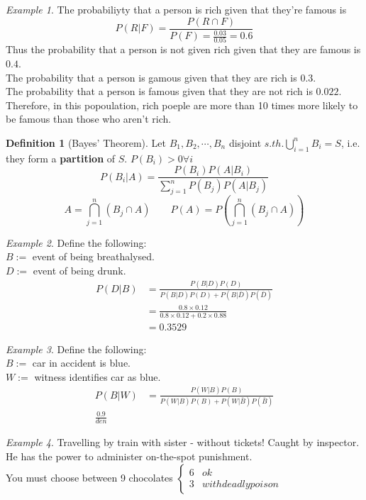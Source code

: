 \documentclass{article}
\let\ddd\cdots
\theoremstyle{definition}
\newtheorem{definition}{Definition}[section]
\theoremstyle{remark}
\theoremstyle{example}
\newtheorem*{example}{Example}
\begin{document}
	\begin{example}
		The probabiliyty that a person is rich given that they're famous is \[P(R|F)=\frac{P(R \cap F)}{P(F)= \frac{0.03}{0.05}=0.6} \]
		Thus the probability that a person is not given rich given that they are famous is $0.4$.\\
		The probability that a person is gamous given that they are rich is $0.3$.\\
		The probability that a person is famous given that they are not rich is $0.022$.\\
		Therefore, in this popoulation, rich poeple are more than 10 times more likely to be famous than those who aren't rich.
	\end{example}

	\begin{definition}[Bayes' Theorem]
		Let $B_1,B_2,\ddd,B_n$ disjoint $s.th. \bigcup_{i=1}^n B_i = S$, i.e. they form a \textbf{partition} of $S$. $P(B_i)>0 \forall i$
		\[	P(B_i|A)=\frac{P(B_i)P(A|B_i)}{\sum_{j=1}^{n}P(B_j)P(A|B_j)} \]
		\[ A = \bigcap_{j=1}^n(B_j \cap A) \qquad P(A)=P\left(\bigcap_{j=1}^n (B_j \cap A)\right) \]
	\end{definition}

	\begin{example}Define the following:\\
		$B := $ event of being breathalysed.\\
		$D := $ event of being drunk.
		\begin{align*}
			P(D|B) & = \frac{P(B|D)P(D)}{P(B|D)P(D)+P(B|\bar{D})P(\bar{D})}\\
			& = \frac{0.8 \times 0.12}{0.8 \times 0.12 + 0.2 \times 0.88}\\
			& = 0.3529
		\end{align*}
	\end{example}

	\begin{example}
		Define the following:\\
		$B:= $ car in accident is blue.\\
		$W:= $ witness identifies car as blue.
		\begin{align*}
			P(B|W) & = \frac{P(W|B)P(B)}{P(W|B)P(B)+P(W|\bar{B})P(\bar{B})}\\
			\frac{0.9}{den}
		\end{align*} 
	\end{example}

	\begin{example}
		Travelling by train with sister - without tickets! Caught by inspector. He has the power to administer on-the-spot punishment.\\
		You must choose between 9 chocolates $
		\begin{cases}
		6 & ok\\
		3 & with deadly poison
		\end{cases}$		
	\end{example}
\end{document}
